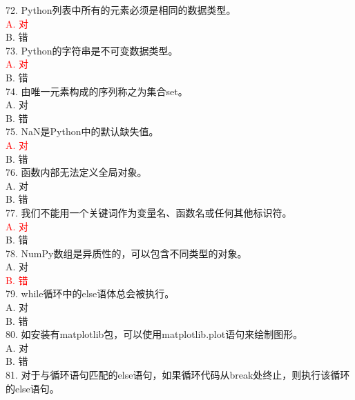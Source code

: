 \documentclass[6pt]{article}
\begin{document}
72. Python列表中所有的元素必须是相同的数据类型。\\

\textcolor{red}{A. 对}\\
B. 错\\

73. Python的字符串是不可变数据类型。\\

\textcolor{red}{A. 对}\\
B. 错\\

74. 由唯一元素构成的序列称之为集合set。\\

A. 对\\
B. 错\\

75. NaN是Python中的默认缺失值。\\

\textcolor{red}{A. 对}\\
B. 错\\

76. 函数内部无法定义全局对象。\\

A. 对\\
B. 错\\

77. 我们不能用一个关键词作为变量名、函数名或任何其他标识符。\\

\textcolor{red}{A. 对}\\
B. 错\\

78. NumPy数组是异质性的，可以包含不同类型的对象。\\

A. 对\\
\textcolor{red}{B. 错}\\

79. while循环中的else语体总会被执行。\\

A. 对\\
B. 错\\

80. 如安装有matplotlib包，可以使用matplotlib.plot语句来绘制图形。\\

A. 对\\
B. 错\\

81. 对于与循环语句匹配的else语句，如果循环代码从break处终止，则执行该循环的else语句。\\
\end{document}
